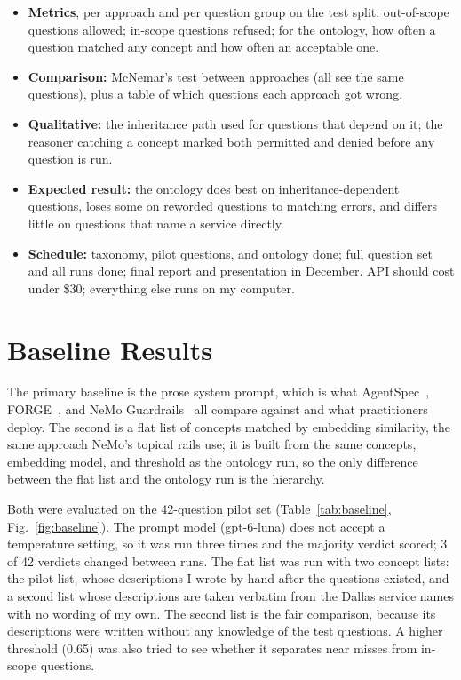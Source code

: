 \documentclass[conference]{IEEEtran}
\begin{document}
\begin{itemize}\setlength{\itemsep}{1pt}
  \item \textbf{Metrics}, per approach and per question group on the test split: out-of-scope questions allowed; in-scope questions refused; for the ontology, how often a question matched any concept and how often an acceptable one.
  \item \textbf{Comparison:} McNemar's test between approaches (all see the same questions), plus a table of which questions each approach got wrong.
  \item \textbf{Qualitative:} the inheritance path used for questions that depend on it; the reasoner catching a concept marked both permitted and denied before any question is run.
  \item \textbf{Expected result:} the ontology does best on inheritance-dependent questions, loses some on reworded questions to matching errors, and differs little on questions that name a service directly.
  \item \textbf{Schedule:} taxonomy, pilot questions, and ontology done; full question set and all runs done; final report and presentation in December. API should cost under \$30; everything else runs on my computer.
\end{itemize}

\section{Baseline Results}

The primary baseline is the prose system prompt, which is what AgentSpec~\cite{agentspec}, FORGE~\cite{forge}, and NeMo Guardrails~\cite{nemo} all compare against and what practitioners deploy. The second is a flat list of concepts matched by embedding similarity, the same approach NeMo's topical rails use; it is built from the same concepts, embedding model, and threshold as the ontology run, so the only difference between the flat list and the ontology run is the hierarchy.

Both were evaluated on the 42-question pilot set (Table~\ref{tab:baseline}, Fig.~\ref{fig:baseline}). The prompt model (gpt-6-luna) does not accept a temperature setting, so it was run three times and the majority verdict scored; 3 of 42 verdicts changed between runs. The flat list was run with two concept lists: the pilot list, whose descriptions I wrote by hand after the questions existed, and a second list whose descriptions are taken verbatim from the Dallas service names with no wording of my own. The second list is the fair comparison, because its descriptions were written without any knowledge of the test questions. A higher threshold (0.65) was also tried to see whether it separates near misses from in-scope questions.
\end{document}
